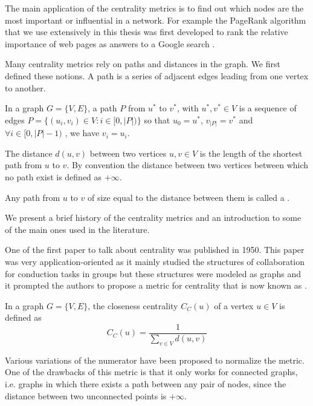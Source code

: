 The main application of the centrality metrics is to find out which nodes are the most important or influential in a network. For example the PageRank algorithm that we use extensively in this thesis was first developed to rank the relative importance of web pages as answers to a Google search \cite{pagerank}.

Many centrality metrics rely on paths and distances in the graph. We first defined these notions. A path is a series of adjacent edges leading from one vertex to another.
\begin{definition}[Path]
    In a graph $G = \{V, E\}$, a path $P$ from $u^*$ to $v^*$, with $u^*, v^* \in V$ is a sequence of edges $P = \{(u_i, v_i) \in V: i\in [0, |P|)\}$ so that $u_0 = u^*$, $v_{|P|} = v^*$ and $\forall i \in [0, |P|-1)$ , we have $v_i = u_i$.
\end{definition}

\begin{definition}
    The distance $d(u, v)$ between two vertices $u, v \in V$ is the length of the shortest path from $u$ to $v$. By convention the distance between two vertices between which no path exist is defined as $+\infty$. 

    Any path from $u$ to $v$ of size equal to the distance between them is called a .
\end{definition}

We present a brief history of the centrality metrics and an introduction to some of the main ones used in the literature.

One of the first paper to talk about centrality was \cite{bavelas1950_firstCentrality} published in 1950. This paper was very application-oriented as it mainly studied the structures of collaboration for conduction tasks in groups but these structures were modeled as graphs and it prompted the authors to propose a metric for centrality that is now known as .
\begin{definition}
    In a graph $G = \{V, E\}$, the closeness centrality $C_C(u)$ of a vertex $u\in V$ is defined as
    \begin{equation}
        C_C(u) = \frac{1}{\sum_{v\in V} d(u, v)}
    \end{equation}
\end{definition}

Various variations of the numerator have been proposed to normalize the metric. One of the drawbacks of this metric is that it only works for connected graphs, i.e. graphs in which there exists a path between any pair of nodes, since the distance between two unconnected points is $+\infty$.

